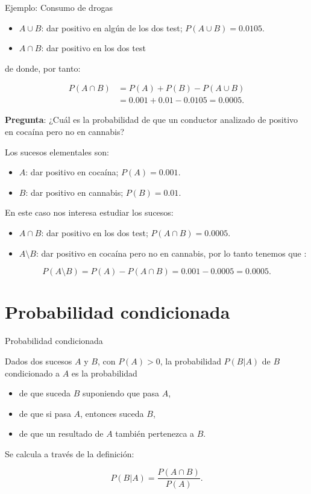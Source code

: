 \documentclass[
  letterpaper,
  DIV=11,
  numbers=noendperiod]{scrreprt}
\providecommand{\tightlist}{%
  \setlength{\itemsep}{0pt}\setlength{\parskip}{0pt}}\usepackage{longtable,booktabs,array}
\begin{document}
\begin{Ejemplo}{Ejemplo: Consumo de drogas}{}
\begin{itemize}
\tightlist
\item
  \(A\cup B\): dar positivo en algún de los dos test;
  \(P(A\cup B)=0.0105.\)
\item
  \(A\cap B\): dar positivo en los dos test
\end{itemize}

de donde, por tanto:

\[\begin{array}{rl}
{P(A\cap B)} &{=P(A)+P(B)-P(A\cup B)}\\ &{=0.001+0.01-0.0105=0.0005}.
\end{array}\]

\textbf{Pregunta}: ¿Cuál es la probabilidad de que un conductor
analizado de positivo en cocaína pero no en cannabis?

Los sucesos elementales son:

\begin{itemize}
\tightlist
\item
  \(A\): dar positivo en cocaína; \(P(A)=0.001.\)
\item
  \(B\): dar positivo en cannabis; \(P(B)=0.01.\)
\end{itemize}

En este caso nos interesa estudiar los sucesos:

\begin{itemize}
\tightlist
\item
  \(A\cap B\): dar positivo en los dos test; \(P(A\cap B)=0.0005.\)
\item
  \(A\setminus B\): dar positivo en cocaína pero no en cannabis, por lo
  tanto tenemos que :
\end{itemize}

\[P(A\setminus B) =P(A)-P(A\cap B) =0.001-0.0005=0.0005.\]

\end{Ejemplo}

\section{Probabilidad condicionada}\label{probabilidad-condicionada}

\begin{Definicion}{Probabilidad condicionada}{}

Dados dos sucesos \(A\) y \(B\), con \(P(A)>0\), la probabilidad
\(P(B|A)\) de \(B\) condicionado a \(A\) es la probabilidad

\begin{itemize}
\tightlist
\item
  de que suceda \(B\) suponiendo que pasa \(A\),
\item
  de que si pasa \(A\), entonces suceda \(B\),
\item
  de que un resultado de \(A\) también pertenezca a \(B\).
\end{itemize}

Se calcula a través de la definición:

\[
P(B|A)=\frac{P(A\cap B)}{P(A)}.
\]

\end{Definicion}
\end{document}

